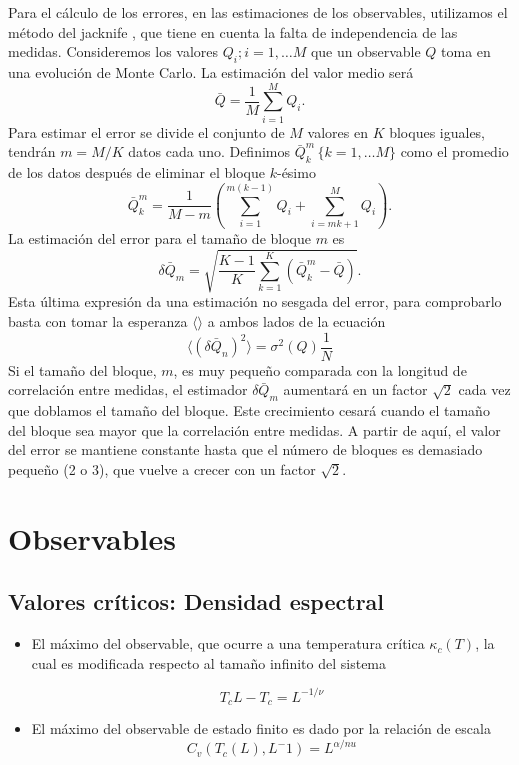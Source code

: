 Para el cálculo de los errores, en las estimaciones de los observables,
utilizamos el método del jacknife \cite{Juan:tesis}, que tiene en cuenta la
falta de independencia de las medidas. Consideremos los valores
${Q_i;i=1,\dots M}$ que un observable $Q$ toma en una evolución de Monte
Carlo. La estimación del valor medio será
\begin{equation}
\bar{Q}=\frac{1}{M}\sum^M_{i=1}Q_i.
\end{equation}
Para estimar el error se divide el conjunto de $M$ valores en $K$ bloques
iguales, tendrán $m=M/K$ datos cada uno. Definimos $\bar{Q}^m_k \, \{k=1,\dots
M\}$ como el promedio de los datos después de eliminar el bloque $k$-ésimo
\begin{equation}
\bar{Q}_k^m=\frac{1}{M-m}\left(\sum^{m(k-1)}_{i=1}Q_i+\sum^{M}_{i=mk+1}Q_i\right).
\end{equation}
La estimación del error para el tamaño de bloque $m$ es
\begin{equation}
\delta\bar{Q}_m=\sqrt{\frac{K-1}{K}\sum^K_{k=1}(\bar{Q}^m_k-\bar{Q})}.
\end{equation}
Esta última expresión da una estimación no sesgada del error, para comprobarlo
basta con tomar la esperanza $\langle \rangle$ a ambos lados de la ecuación
\begin{equation}
\langle (\delta\bar{Q}_n)^2\rangle=\sigma^2(Q)\frac{1}{N} 
\end{equation}
Si el tamaño del bloque, $m$, es muy pequeño comparada con la longitud de
correlación entre medidas, el estimador $\delta\bar{Q}_m$ aumentará en un
factor $\sqrt{2}$ cada vez que doblamos el tamaño del bloque. Este crecimiento
cesará cuando el tamaño del bloque sea mayor que la correlación entre
medidas. A partir de aquí, el valor del error se mantiene constante hasta que
el número de bloques es demasiado pequeño (2 o 3), que vuelve a crecer con un
factor $\sqrt{2}$.

\section{Observables}

\subsection{Valores críticos: Densidad espectral}

\begin{itemize}
\item El máximo del observable, que ocurre a una temperatura crítica
  $\kappa_c(T)$, la cual es modificada respecto al tamaño infinito del sistema

$$ T_cL -T_c= L^{-1/\nu}$$
\item El máximo del observable de estado finito es dado por la relación de
  escala
$$ C_v(T_c(L),L^-1)=L^{\alpha/nu}$$
\end{itemize}


